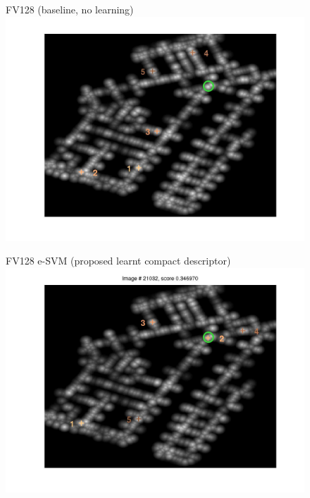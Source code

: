 \documentclass[10pt,onecolumn,A4]{article}
\begin{document}
\begin{figure}
	\begin{minipage}{0.45\linewidth}
		\center
		FV128 (baseline, no learning) \\
		\includegraphics[trim = 55mm 40mm 55mm 25mm, clip=true,width=\linewidth]{sup1383/heatRaw.jpg}
	\end{minipage} 
	\begin{minipage}{0.45\linewidth}
		\center
		FV128 e-SVM (proposed learnt compact descriptor) \\
		\includegraphics[trim = 55mm 40mm 55mm 25mm, clip=true,width=\linewidth]{sup1383/heatSvm.jpg}
	\end{minipage} 
	\\

\end{figure}
\end{document}
